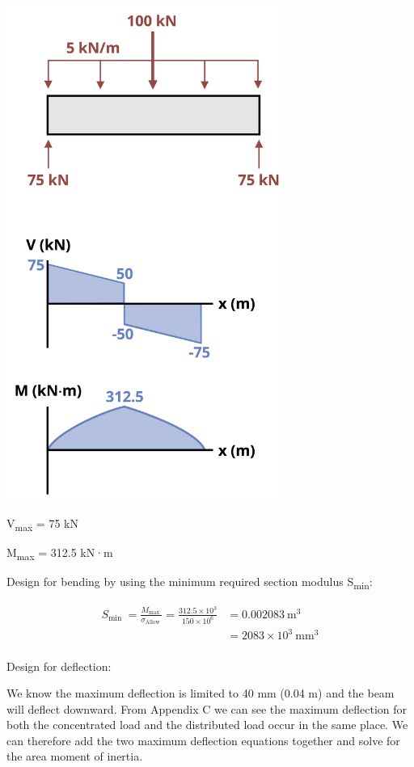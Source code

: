 \documentclass[
  letterpaper,
  DIV=11,
  numbers=noendperiod]{scrreprt}
\begin{document}
\begin{tcolorbox}
\begin{tcolorbox}
\begin{center}
\includegraphics[width=3.5625in,height=\textheight]{images/CH11 PNGs/example11.9-2.png}
\end{center}

V\textsubscript{max} = 75 kN

M\textsubscript{max} = 312.5 kN·m

Design for bending by using the minimum required section modulus
S\textsubscript{min}:

\[
\begin{aligned}  S_{\text {min }}=\frac{M_{\text {max }}}{\sigma_{\text {Allow }}}=\frac{312.5 \times 10^3}{150 \times 10^6} & =0.002083 \mathrm{~m}^3 \\ & =2083 \times 10^3 \mathrm{~mm}^3 \\ & \end{aligned}
\]

Design for deflection:

We know the maximum deflection is limited to 40 mm (0.04 m) and the beam
will deflect downward. From Appendix C we can see the maximum deflection
for both the concentrated load and the distributed load occur in the
same place. We can therefore add the two maximum deflection equations
together and solve for the area moment of inertia.


\end{tcolorbox}
\end{tcolorbox}
\end{document}
